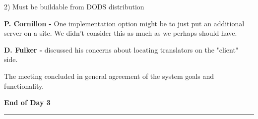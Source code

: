 \begin{description}
\begin{description}
	\item{2)} Must be buildable from DODS distribution
\end{description}


\smallskip
{\bf P. Cornillon -}  One implementation option might be to just put an 
additional server on a site.  We didn't consider this as much as we perhaps 
should have.

\smallskip
{\bf D. Fulker -} discussed his concerns about locating translators on the 
"client" side.


The meeting concluded in general agreement of the system goals and 
functionality.  

\begin{center}
{\bf End of Day 3}
\end{center}
\begin{latexonly}
\vskip4pt\hrule height2pt\smallskip
\end{latexonly}
\end{description}
%
